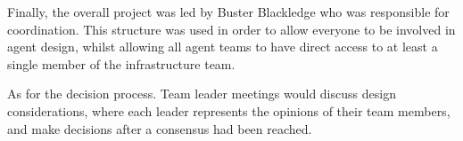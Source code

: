 
Finally, the overall project was led by Buster Blackledge who was responsible for coordination. This structure was used in order to allow everyone to be involved in agent design, whilst allowing all agent teams to have direct access to at least a single member of the infrastructure team. 

As for the decision process. Team leader meetings would discuss design considerations, where each leader represents the opinions of their team members, and make decisions after a consensus had been reached. 


